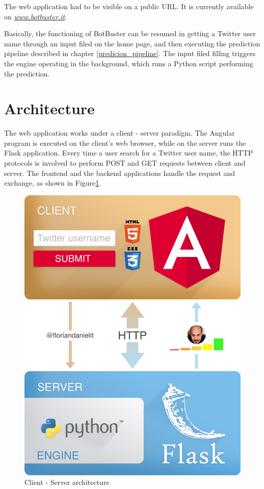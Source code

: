 The web application had to be visible on a public URL. It is currently available on \href{http://www.botbuster.it}{\textit{www.botbuster.it}}.

Basically, the functioning of BotBuster can be resumed in getting a Twitter user name through an input filed on the home page, and then executing the prediction pipeline described in chapter \ref{predicion_pipeline}.
The input filed filling triggers the engine operating in the background, which runs a Python script performing the prediction.
\section{Architecture}
The web application works under a client - server paradigm. The Angular program is executed on the client's web browser, while on the server runs the Flask application.
Every time a user search for a Twitter user name, the HTTP protocols is involved to perform POST and GET requests between client and server. The frontend and the backend applications handle the request and exchange, as shown in Figure\ref{fig:architecture}.
\begin{figure}[t!]
	\begin{center}
		\includegraphics[width=0.6\columnwidth]{chapter7/figure/architecture.png} 
	\end{center}
	\caption{Client - Server architecture}
	\label{fig:architecture}
\end{figure}


